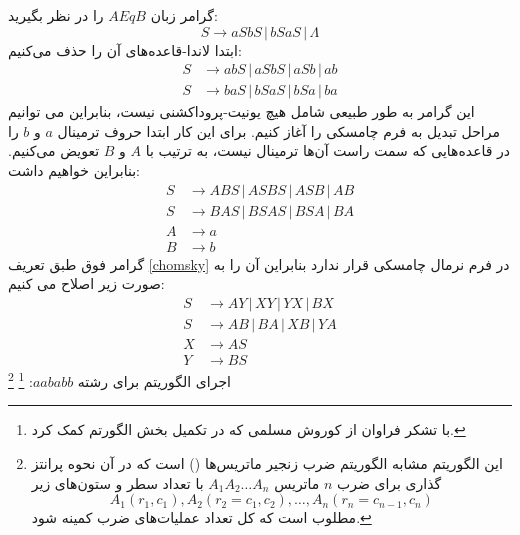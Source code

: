 \documentclass[main.tex]{subfiles}
\begin{document}
	\begin{example}
			گرامر زبان
			$AEqB$
			 را در نظر بگیرید:
		$$S \rightarrow aSbS \, | \, bSaS \, | \, \Lambda$$
	ابتدا لاندا-قاعده‌های آن را حذف می‌کنیم: 
		\begin{align*}
			S &\rightarrow abS \, | \, aSbS \, | \, aSb \, | \, ab \\
			S &\rightarrow baS \, | \, bSaS \, | \, bSa \, | \, ba
		\end{align*}
	این گرامر به طور طبیعی شامل هیچ یونیت-پروداکشنی نیست، بنابراین می توانیم مراحل تبدیل به فرم چامسکی را آغاز کنیم. برای این کار ابتدا حروف ترمینال $a$ و $b$ را در قاعده‌هایی که سمت راست آن‌ها ترمینال نیست، به ترتیب با $A$ و $B$ تعویض می‌کنیم. بنابراین خواهیم داشت:
	\begin{align*}
		S &\rightarrow ABS \, | \, ASBS \, | \, ASB \, | \, AB \\
		S &\rightarrow BAS \, | \, BSAS \, | \, BSA \, | \, BA  \\
		A &\rightarrow a \\
		B &\rightarrow b
	\end{align*}
		گرامر فوق طبق تعریف
		\ref{chomsky}
		در فرم نرمال چامسکی قرار ندارد بنابراین آن را به صورت زیر اصلاح می کنیم:
		\begin{align*}
			S &\rightarrow AY \, | \, XY \, | \, YX \, | \, BX \\
			S &\rightarrow AB \, | \, BA \, | \, XB \, | \, YA \\
			X &\rightarrow AS \\
			Y &\rightarrow BS
		\end{align*}
		اجرای الگوریتم
		 برای رشته 
		$aababb$:
		\footnote{
		با تشکر فراوان از کوروش مسلمی که در تکمیل بخش الگورتم 
		 کمک کرد.
	}
\footnote{
این الگوریتم مشابه الگوریتم ضرب زنجیر ماتریس‌ها 
()
است که در آن نحوه پرانتز گذاری برای ضرب $n$ ماتریس 
$A_1A_2\dots A_n$
با تعداد سطر و ستون‌های زیر
$$A_1(r_1, c_1), A_2(r_2 = c_1, c_2), \dots, A_n(r_n = c_{n-1}, c_n)$$
مطلوب است که کل تعداد عملیات‌های ضرب کمینه شود.
}
		

\end{example}
\end{document}

